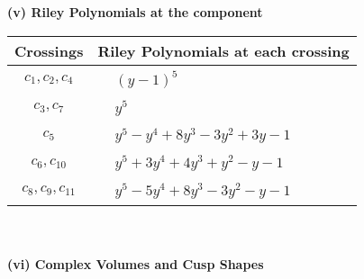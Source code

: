 \documentclass[1p]{elsarticle_modified}
\theoremstyle{definition}
\begin{document}
\newpage\renewcommand{\arraystretch}{1}
\flushleft \textbf{(v) Riley Polynomials at the component}\newline \\
\begin{tabular}{m{50pt}|m{274pt}}
Crossings & \hspace{64pt}Riley Polynomials at each crossing \\
\hline $$\begin{aligned}c_{1},c_{2},c_{4}\end{aligned}$$&$\begin{aligned}
&(y-1)^5
\end{aligned}$\\
\hline $$\begin{aligned}c_{3},c_{7}\end{aligned}$$&$\begin{aligned}
&y^5
\end{aligned}$\\
\hline $$\begin{aligned}c_{5}\end{aligned}$$&$\begin{aligned}
&y^5- y^4+8 y^3-3 y^2+3 y-1
\end{aligned}$\\
\hline $$\begin{aligned}c_{6},c_{10}\end{aligned}$$&$\begin{aligned}
&y^5+3 y^4+4 y^3+y^2- y-1
\end{aligned}$\\
\hline $$\begin{aligned}c_{8},c_{9},c_{11}\end{aligned}$$&$\begin{aligned}
&y^5-5 y^4+8 y^3-3 y^2- y-1
\end{aligned}$\\
\hline
\end{tabular}\\~\\
\newpage\flushleft \textbf{(vi) Complex Volumes and Cusp Shapes}
\end{document}
